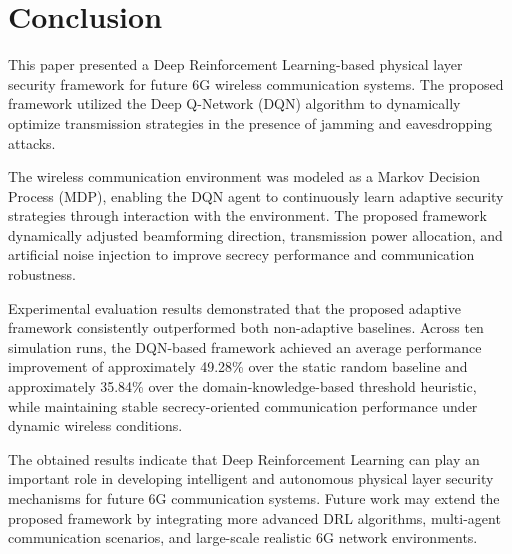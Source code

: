 \documentclass[conference]{IEEEtran}
\begin{document}
\section{Conclusion}

This paper presented a Deep Reinforcement Learning-based physical layer security framework for future 6G wireless communication systems. The proposed framework utilized the Deep Q-Network (DQN) algorithm to dynamically optimize transmission strategies in the presence of jamming and eavesdropping attacks.

The wireless communication environment was modeled as a Markov Decision Process (MDP), enabling the DQN agent to continuously learn adaptive security strategies through interaction with the environment. The proposed framework dynamically adjusted beamforming direction, transmission power allocation, and artificial noise injection to improve secrecy performance and communication robustness.

Experimental evaluation results demonstrated that the proposed adaptive framework consistently outperformed both non-adaptive baselines. Across ten simulation runs, the DQN-based framework achieved an average performance improvement of approximately 49.28\% over the static random baseline and approximately 35.84\% over the domain-knowledge-based threshold heuristic, while maintaining stable secrecy-oriented communication performance under dynamic wireless conditions.

The obtained results indicate that Deep Reinforcement Learning can play an important role in developing intelligent and autonomous physical layer security mechanisms for future 6G communication systems. Future work may extend the proposed framework by integrating more advanced DRL algorithms, multi-agent communication scenarios, and large-scale realistic 6G network environments.
\end{document}
